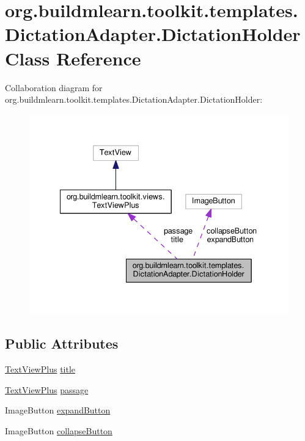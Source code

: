 \hypertarget{classorg_1_1buildmlearn_1_1toolkit_1_1templates_1_1DictationAdapter_1_1DictationHolder}{}\section{org.\+buildmlearn.\+toolkit.\+templates.\+Dictation\+Adapter.\+Dictation\+Holder Class Reference}
\label{classorg_1_1buildmlearn_1_1toolkit_1_1templates_1_1DictationAdapter_1_1DictationHolder}


Collaboration diagram for org.\+buildmlearn.\+toolkit.\+templates.\+Dictation\+Adapter.\+Dictation\+Holder\+:
\nopagebreak
\begin{figure}[H]
\begin{center}
\leavevmode
\includegraphics[width=334pt]{classorg_1_1buildmlearn_1_1toolkit_1_1templates_1_1DictationAdapter_1_1DictationHolder__coll__graph}
\end{center}
\end{figure}
\subsection*{Public Attributes}
\begin{DoxyCompactItemize}
\item 
\hyperlink{classorg_1_1buildmlearn_1_1toolkit_1_1views_1_1TextViewPlus}{Text\+View\+Plus} \hyperlink{classorg_1_1buildmlearn_1_1toolkit_1_1templates_1_1DictationAdapter_1_1DictationHolder_a92bd6c2566c45fb1ac95bbc0c2cd53f8}{title}
\item 
\hyperlink{classorg_1_1buildmlearn_1_1toolkit_1_1views_1_1TextViewPlus}{Text\+View\+Plus} \hyperlink{classorg_1_1buildmlearn_1_1toolkit_1_1templates_1_1DictationAdapter_1_1DictationHolder_ab93b259ad6809a922605040db2a285eb}{passage}
\item 
Image\+Button \hyperlink{classorg_1_1buildmlearn_1_1toolkit_1_1templates_1_1DictationAdapter_1_1DictationHolder_a767d0993d068b4caf90ef7cf9688d8ec}{expand\+Button}
\item 
Image\+Button \hyperlink{classorg_1_1buildmlearn_1_1toolkit_1_1templates_1_1DictationAdapter_1_1DictationHolder_afebbf5c70c83bdaab95648f6dc71e14c}{collapse\+Button}
\end{DoxyCompactItemize}


